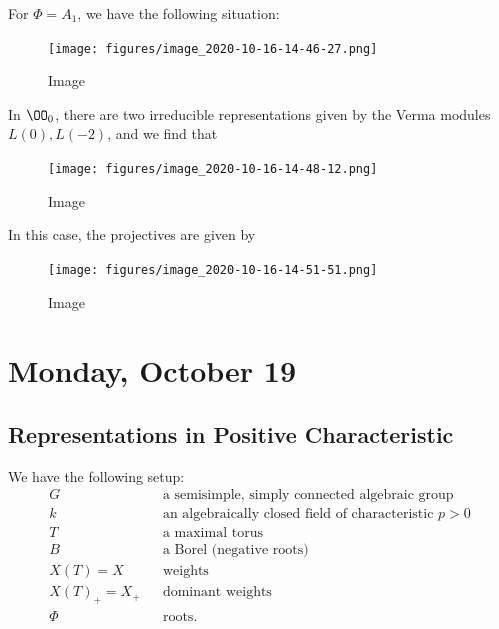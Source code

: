 \begin{example}

For \(\Phi = A_1\), we have the following situation:

\begin{figure}
\centering
\texttt{[image: figures/image\_2020-10-16-14-46-27.png]}
\caption{Image}
\end{figure}

In \(\OO_0\), there are two irreducible representations given by the
Verma modules \(L(0), L(-2)\), and we find that

\begin{figure}
\centering
\texttt{[image: figures/image\_2020-10-16-14-48-12.png]}
\caption{Image}
\end{figure}

In this case, the projectives are given by

\begin{figure}
\centering
\texttt{[image: figures/image\_2020-10-16-14-51-51.png]}
\caption{Image}
\end{figure}

\end{example}

\hypertarget{monday-october-19}{%
\section{Monday, October 19}\label{monday-october-19}}


\hypertarget{representations-in-positive-characteristic}{%
\subsection{Representations in Positive
Characteristic}\label{representations-in-positive-characteristic}}

We have the following setup:
\begin{align*}  
G && \text{a semisimple, simply connected algebraic group} \\
k && \text{an algebraically closed field of characteristic $p>0$} \\
T && \text{a maximal torus} \\
B && \text{a Borel (negative roots)} \\
X(T) = X && \text{weights} \\
X(T)_+ = X_+ && \text{dominant weights} \\
\Phi && \text{roots}
.\end{align*}

